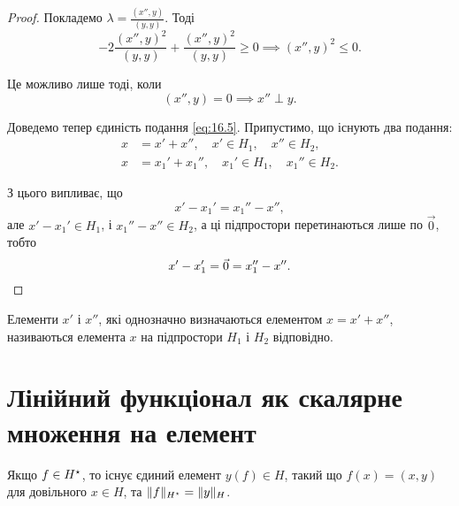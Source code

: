 \begin{proof}
Покладемо $\lambda = \frac{(x'', y)}{(y, y)}$. Тоді
\begin{equation*}
    - 2\frac{(x'', y)^2}{(y, y)} + \frac{(x'', y)^2}{(y, y)} \ge 0 \implies
    (x'', y)^2 \le 0.
\end{equation*}

Це можливо лише тоді, коли
\begin{equation*}
    (x'', y) = 0 \implies x'' \perp y.
\end{equation*}

Доведемо тепер єдиність подання \eqref{eq:16.5}. Припустимо, що
існують два подання:
\begin{align*}
    x &= x' + x'', \quad x' \in H_1, \quad x'' \in H_2, \\
    x &= x_1' + x_1'', \quad x_1' \in H_1, \quad x_1'' \in H_2.
\end{align*}

З цього випливає, що
\begin{equation*}
    x' - x_1' = x_1'' - x'',
\end{equation*}
але $x' - x_1' \in H_1$, і $x_1'' - x'' \in H_2$,
а ці підпростори перетинаються лише по $\vec 0$, тобто
\begin{equation*}
    x' - x_1' = \vec 0 = x_1'' - x''. \qedhere
\end{equation*}
\end{proof}

\begin{definition}
Елементи $x'$ і $x''$, які однозначно
визначаються елементом $x = x' + x''$, називаються
 елемента $x$ на підпростори $H_1$ і $H_2$
відповідно.
\end{definition}

\section{Лінійний функціонал як скалярне множення на елемент}

\begin{theorem}[Рісса] Якщо
$f \in H^\star$, то існує єдиний елемент
$y(f) \in H$, такий що $f(x) = (x, y)$ для довільного
$x \in H$, та $\|f\|_{H^\star} = \|y\|_H$.
\end{theorem}

